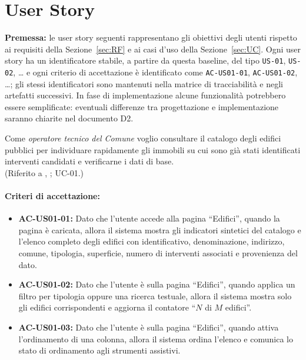 \section{User Story}
\label{sec:US}

\textbf{Premessa:} le user story seguenti rappresentano gli obiettivi degli utenti rispetto ai requisiti della Sezione~\ref{sec:RF} e ai casi d'uso della Sezione~\ref{sec:UC}. Ogni user story ha un identificatore stabile, a partire da questa baseline, del tipo \texttt{US-01}, \texttt{US-02}, \ldots{} e ogni criterio di accettazione è identificato come \texttt{AC-US01-01}, \texttt{AC-US01-02}, \ldots{}; gli stessi identificatori sono mantenuti nella matrice di tracciabilità e negli artefatti successivi. In fase di implementazione alcune funzionalità potrebbero essere semplificate: eventuali differenze tra progettazione e implementazione saranno chiarite nel documento D2.

 \label{us:edifici}
Come \textit{operatore tecnico del Comune} voglio consultare il catalogo degli edifici pubblici per individuare rapidamente gli immobili su cui sono già stati identificati interventi candidati e verificarne i dati di base. \\ (Riferito a , ; UC-01.)

\paragraph{Criteri di accettazione:}
\begin{itemize}[leftmargin=1.4em]
    \item \textbf{AC-US01-01:} Dato che l'utente accede alla pagina ``Edifici'', quando la pagina è caricata, allora il sistema mostra gli indicatori sintetici del catalogo e l'elenco completo degli edifici con identificativo, denominazione, indirizzo, comune, tipologia, superficie, numero di interventi associati e provenienza del dato.
    \item \textbf{AC-US01-02:} Dato che l'utente è sulla pagina ``Edifici'', quando applica un filtro per tipologia oppure una ricerca testuale, allora il sistema mostra solo gli edifici corrispondenti e aggiorna il contatore ``$N$ di $M$ edifici''.
    \item \textbf{AC-US01-03:} Dato che l'utente è sulla pagina ``Edifici'', quando attiva l'ordinamento di una colonna, allora il sistema ordina l'elenco e comunica lo stato di ordinamento agli strumenti assistivi.
\end{itemize}

